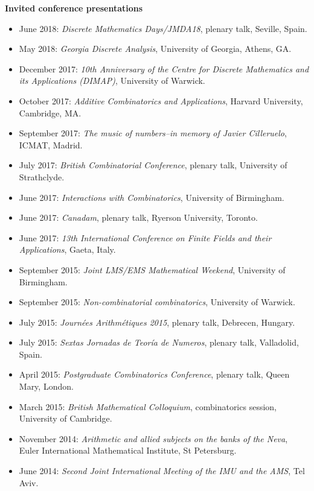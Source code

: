 \documentclass[11pt]{article}
\newenvironment{mitemize}{
\begin{itemize}
  \setlength{\itemsep}{1pt}
  \setlength{\parskip}{0pt}
  \setlength{\parsep}{0pt}
}{\end{itemize}}
\begin{document}
\vspace{3pt}
\textbf{Invited conference presentations}
\begin{mitemize}
\item June 2018: \textit{Discrete Mathematics Days/JMDA18}, plenary talk, Seville, Spain.
\item May 2018: \textit{Georgia Discrete Analysis}, University of Georgia, Athens, GA.
\item December 2017: \textit{10th Anniversary of the Centre for Discrete Mathematics and its Applications (DIMAP)}, University of Warwick.
\item October 2017: \textit{Additive Combinatorics and Applications}, Harvard University, Cambridge, MA.
\item September 2017: \textit{The music of numbers--in memory of Javier Cilleruelo}, ICMAT, Madrid.
\item July 2017: \textit{British Combinatorial Conference}, plenary talk, University of Strathclyde.
\item June 2017: \textit{Interactions with Combinatorics}, University of Birmingham.
\item June 2017: \textit{Canadam}, plenary talk, Ryerson University, Toronto.
\item June 2017: \textit{13th International Conference on Finite Fields and their Applications}, Gaeta, Italy.
\item September 2015: \textit{Joint LMS/EMS Mathematical Weekend}, University of Birmingham.
\item September 2015: \textit{Non-combinatorial combinatorics}, University of Warwick.
\item July 2015: \textit{Journ\'ees Arithm\'etiques 2015}, plenary talk, Debrecen, Hungary.
\item July 2015: \textit{Sextas Jornadas de Teor\'ia de Numeros}, plenary talk, Valladolid, Spain.
\item April 2015: \textit{Postgraduate Combinatorics Conference}, plenary talk, Queen Mary, London. 
\item March 2015: \textit{British Mathematical Colloquium}, combinatorics session, University of Cambridge.
\item November 2014: \textit{Arithmetic and allied subjects on the banks of the Neva}, Euler International Mathematical Institute, St Petersburg. 
\item June 2014: \textit{Second Joint International Meeting of the IMU and the AMS}, Tel Aviv.

\end{mitemize}
\end{document}
